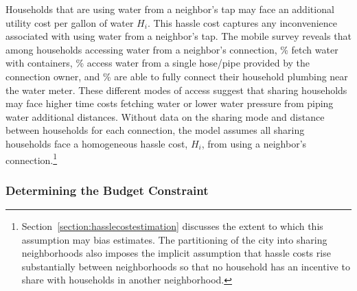 \documentclass[12pt]{article}
\begin{document}
Households that are using water from a neighbor's tap may face an additional utility cost per gallon of water $H_i$.  This hassle cost captures any inconvenience associated with using water from a neighbor's tap.  The mobile survey reveals that among households accessing water from a neighbor's connection, \unskip\% fetch water with containers, \unskip\% access water from a single hose/pipe provided by the connection owner, and \unskip\% are able to fully connect their household plumbing near the water meter.  These different modes of access suggest that sharing households may face higher time costs fetching water or lower water pressure from piping water additional distances.  Without data on the sharing mode and distance between households for each connection, the model assumes all sharing households face a homogeneous hassle cost, $H_i$, from using a neighbor's connection.\footnote{Section~\ref{section:hasslecostestimation} discusses the extent to which this assumption may bias estimates.  The partitioning of the city into sharing neighborhoods also imposes the implicit assumption that hassle costs rise substantially between neighborhoods so that no household has an incentive to share with households in another neighborhood.}  


\subsubsection{Determining the Budget Constraint}
\end{document}
